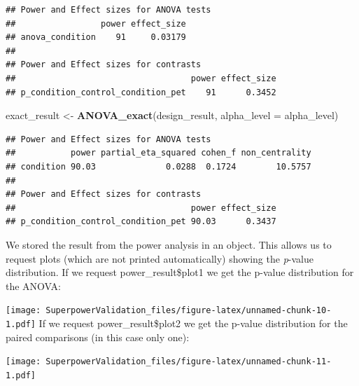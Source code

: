 \documentclass[]{book}
\newenvironment{Shaded}{\begin{snugshade}}{\end{snugshade}}
\newcommand{\DataTypeTok}[1]{\textcolor[rgb]{0.13,0.29,0.53}{#1}}
\newcommand{\KeywordTok}[1]{\textcolor[rgb]{0.13,0.29,0.53}{\textbf{#1}}}
\newcommand{\NormalTok}[1]{#1}
\newcommand{\OperatorTok}[1]{\textcolor[rgb]{0.81,0.36,0.00}{\textbf{#1}}}
\newcommand{\StringTok}[1]{\textcolor[rgb]{0.31,0.60,0.02}{#1}}
\begin{document}
\begin{verbatim}
## Power and Effect sizes for ANOVA tests
##                 power effect_size
## anova_condition    91     0.03179
## 
## Power and Effect sizes for contrasts
##                                   power effect_size
## p_condition_control_condition_pet    91      0.3452
\end{verbatim}

\begin{Shaded}
\begin{Highlighting}[]
\NormalTok{exact_result <-}\StringTok{ }\KeywordTok{ANOVA_exact}\NormalTok{(design_result, }\DataTypeTok{alpha_level =}\NormalTok{ alpha_level)}
\end{Highlighting}
\end{Shaded}

\begin{verbatim}
## Power and Effect sizes for ANOVA tests
##           power partial_eta_squared cohen_f non_centrality
## condition 90.03              0.0288  0.1724        10.5757
## 
## Power and Effect sizes for contrasts
##                                   power effect_size
## p_condition_control_condition_pet 90.03      0.3437
\end{verbatim}

We stored the result from the power analysis in an object. This allows us to request plots (which are not printed automatically) showing the \emph{p}-value distribution. If we request power\_result\$plot1 we get the p-value distribution for the ANOVA:

\begin{Shaded}
\end{Shaded}

\texttt{[image: SuperpowerValidation\_files/figure-latex/unnamed-chunk-10-1.pdf]}
If we request power\_result\$plot2 we get the p-value distribution for the paired comparisons (in this case only one):

\begin{Shaded}
\end{Shaded}

\texttt{[image: SuperpowerValidation\_files/figure-latex/unnamed-chunk-11-1.pdf]}
\end{document}
